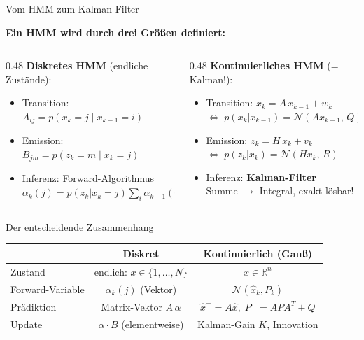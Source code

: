 \documentclass[%
  aspectratio=169,
  10pt
]{beamer}
\newcommand{\R}{\mathbb{R}}
\begin{document}
\begin{frame}{Vom HMM zum Kalman-Filter}

\textbf{Ein HMM wird durch drei Größen definiert:}

\vspace{1mm}
\begin{columns}[T]
  \begin{column}{0.48\textwidth}
    \textbf{Diskretes HMM} (endliche Zustände):
    \begin{itemize}\setlength{\itemsep}{1pt}
      \item Transition: $A_{ij} = p(x_k{=}j \mid x_{k-1}{=}i)$
      \item Emission: $B_{jm} = p(z_k{=}m \mid x_k{=}j)$
      \item Inferenz: Forward-Algorithmus\\
            $\alpha_k(j) = p(z_k|x_k{=}j)\!\sum_i \alpha_{k-1}(i)\,A_{ij}$
    \end{itemize}
  \end{column}
  \begin{column}{0.48\textwidth}
    \textbf{Kontinuierliches HMM} (= Kalman!):
    \begin{itemize}\setlength{\itemsep}{1pt}
      \item Transition: $x_k = A\,x_{k-1} + w_k$\\
            {\scriptsize $\Leftrightarrow\; p(x_k|x_{k-1}) = \mathcal{N}(Ax_{k-1},\, Q)$}
      \item Emission: $z_k = H\,x_k + v_k$\\
            {\scriptsize $\Leftrightarrow\; p(z_k|x_k) = \mathcal{N}(Hx_k,\, R)$}
      \item Inferenz: \textbf{Kalman-Filter}\\
            {\scriptsize Summe $\to$ Integral, exakt lösbar!}
    \end{itemize}
  \end{column}
\end{columns}

\vspace{2mm}
\begin{block}{Der entscheidende Zusammenhang}
  \vspace{-2mm}
  \begin{center}
  \renewcommand{\arraystretch}{1.2}
  \begin{tabular}{lcc}
    & \textbf{Diskret} & \textbf{Kontinuierlich (Gauß)} \\\hline
    Zustand & endlich: $x \in \{1,\ldots,N\}$ & $x \in \R^n$ \\
    Forward-Variable & $\alpha_k(j)$ (Vektor) & $\mathcal{N}(\hat{x}_k, P_k)$ \\
    Prädiktion & Matrix-Vektor $A\,\alpha$ & $\hat{x}^- = A\hat{x},\; P^- = APA^T\!+Q$ \\
    Update & $\alpha \cdot B$ (elementweise) & Kalman-Gain $K$, Innovation
  \end{tabular}
  \end{center}
  \vspace{-2mm}
\end{block}

\end{frame}
\end{document}
